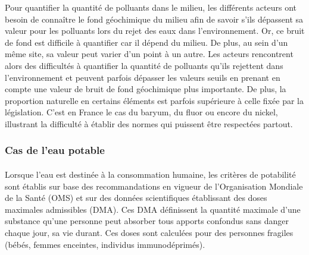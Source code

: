 \documentclass{article}
\begin{document}
Pour quantifier la quantité de polluants dans le milieu, les différents acteurs ont besoin de connaître le fond géochimique du milieu afin de savoir s’ils dépassent sa valeur pour les polluants lors du rejet des eaux dans l’environnement. Or, ce bruit de fond est difficile à quantifier car il dépend du milieu. De plus, au sein d’un même site, sa valeur peut varier d’un point à un autre. Les acteurs rencontrent alors des difficultés à quantifier la quantité de polluants qu’ils rejettent dans l’environnement et peuvent parfois dépasser les valeurs seuils en prenant en compte une valeur de bruit de fond géochimique plus importante. De plus, la proportion naturelle en certains éléments est parfois supérieure à celle fixée par la législation. C’est en France le cas du baryum, du fluor ou encore du nickel, illustrant la difficulté à établir des normes qui puissent être respectées partout.


\subsubsection{Cas de l’eau potable} 
\paragraph{} Lorsque l’eau est destinée à la consommation humaine, les critères de potabilité sont établis sur base des recommandations en vigueur de l’Organisation Mondiale de la Santé (OMS) et sur des données scientifiques établissant des doses maximales admissibles (DMA). Ces DMA définissent la quantité maximale d’une substance qu’une personne peut absorber tous apports confondus sans danger chaque jour, sa vie durant. Ces doses sont calculées pour des personnes fragiles (bébés, femmes enceintes, individus immunodéprimés).
\end{document}
